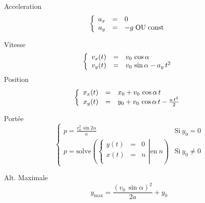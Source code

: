 \documentclass[12pt,a4paper]{article} %
\newcommand\const{\mathrm{const}}
\begin{document}
\begin{twocols}
	Acceleration
	\begin{equation*}
	\left\{
		\begin{array}{rcl}
			\formula{a_x}{0} \\
			\formula{a_y}{-g\;\text{OU}\;\const} \\
		\end{array}
	\right.
	\end{equation*}
	\par\vspace{1em}
	Vitesse
	\begin{equation*}
	\left\{
		\begin{array}{rcl}
			v_x(t) & = & v_0\,\cos{\alpha} \\
			v_y(t) & = & v_0\,\sin{\alpha}-a_y\,t^2 \\
		\end{array}
	\right.
	\end{equation*}
	Position
	\begin{equation*}
	\left\{
		\begin{array}{rcl}
			x_x(t) & = & x_0+v_0\,\cos{\alpha}\,t \\
			x_y(t) & = & y_0+v_0\,\cos{\alpha}\,t-\frac{a\,t^2}{2} \\
		\end{array}
	\right.
	\end{equation*}

\nextcol
	
	Port\'ee
	\begin{equation*}
		\left\{
		\begin{array}{ll}
			p=\frac{v_0^2\,\sin{2\alpha}}{a} & \text{Si}\:y_0 = 0 \\
			p=\text{solve}\left(\left\{
					\begin{array}{rcl}
						y(t) & = & 0 \\
						x(t) & = & n \\
					\end{array}
			\right|
				\text{en} \: n
			\right)
			 & \text{Si}\:y_0 \neq 0
		\end{array}
		\right.
	\end{equation*}

	Alt. Maximale
	\begin{equation*}
		y_\text{max} = \frac{(v_0\,\sin{\alpha})^2}{2a} + y_0
	\end{equation*}

\end{twocols}
\end{document}
